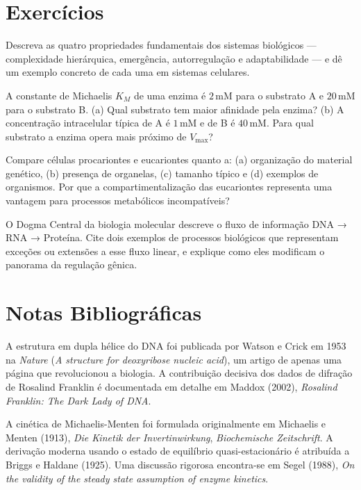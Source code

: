 \section{Exercícios}

\begin{exercicio}
Descreva as quatro propriedades fundamentais dos sistemas biológicos --- complexidade
hierárquica, emergência, autorregulação e adaptabilidade --- e dê um exemplo concreto
de cada uma em sistemas celulares.
\end{exercicio}

\begin{exercicio}
A constante de Michaelis $K_M$ de uma enzima é $2\,\text{mM}$ para o substrato A e $20\,\text{mM}$ para
o substrato B. (a) Qual substrato tem maior afinidade pela enzima? (b) A concentração
intracelular típica de A é $1\,\text{mM}$ e de B é $40\,\text{mM}$. Para qual substrato a enzima opera
mais próximo de $V_{\max}$?
\end{exercicio}

\begin{exercicio}
Compare células procariontes e eucariontes quanto a: (a) organização do material genético,
(b) presença de organelas, (c) tamanho típico e (d) exemplos de organismos. Por que
a compartimentalização das eucariontes representa uma vantagem para processos metabólicos
incompatíveis?
\end{exercicio}

\begin{exercicio}
O Dogma Central da biologia molecular descreve o fluxo de informação DNA → RNA → Proteína.
Cite dois exemplos de processos biológicos que representam exceções ou extensões a esse
fluxo linear, e explique como eles modificam o panorama da regulação gênica.
\end{exercicio}

\section{Notas Bibliográficas}

A estrutura em dupla hélice do DNA foi publicada por Watson e Crick em 1953 na
\textit{Nature} (\textit{A structure for deoxyribose nucleic acid}), um artigo de
apenas uma página que revolucionou a biologia. A contribuição decisiva dos dados de
difração de Rosalind Franklin é documentada em detalhe em Maddox (2002),
\textit{Rosalind Franklin: The Dark Lady of DNA}.

A cinética de Michaelis-Menten foi formulada originalmente em Michaelis e Menten (1913),
\textit{Die Kinetik der Invertinwirkung}, \textit{Biochemische Zeitschrift}. A derivação
moderna usando o estado de equilíbrio quasi-estacionário é atribuída a Briggs e Haldane
(1925). Uma discussão rigorosa encontra-se em Segel (1988), \textit{On the validity of
the steady state assumption of enzyme kinetics}.

